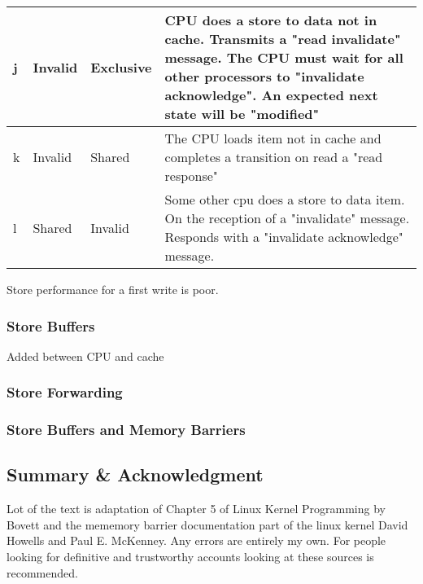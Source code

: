 \documentclass{article}
\begin{document}
\begin{tabular*}{0.75\textwidth} {| l | l | l | p{5cm}| }
    \hline

    j & Invalid & Exclusive &

    CPU does a store to data not in cache. Transmits a "read
    invalidate" message. The CPU must wait for all other processors to
    "invalidate acknowledge". An expected next state will be
    "modified"  
    \\
    \hline

    k & Invalid & Shared &
    
    The CPU loads item not in cache and completes a transition on read
    a "read response"     \\


    \hline
    l & Shared & Invalid &
    
    Some other cpu does a store to data item. On the reception of a
    "invalidate" message. Responds with a "invalidate acknowledge"
    message. \\

    \hline    
  \end{tabular*}


Store performance for a first write is poor.


\subsubsection{Store Buffers}
Added between CPU and cache
\subsubsection{Store Forwarding}
\subsubsection{Store Buffers and Memory Barriers}


\subsection{Summary \& Acknowledgment}

Lot of the text is adaptation of Chapter 5 of Linux Kernel Programming
by Bovett and the mememory barrier documentation part of the linux
kernel David Howells and Paul E. McKenney. Any errors are entirely my
own. For people looking for definitive and trustworthy accounts
looking at these sources is recommended.
\end{document}
